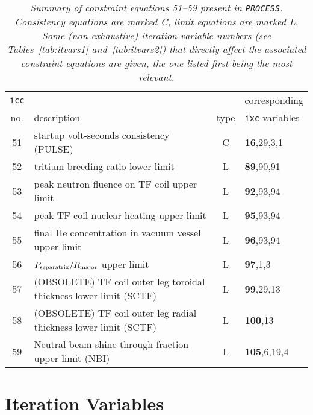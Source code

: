 \documentclass[11pt,a4paper]{report}
\newcommand{\process}{\mbox{\texttt{PROCESS}}}
\begin{document}
\begin{table}[tbph]
\footnotesize
\begin{center}

\begin{tabular}{||c|l|c|l||} \hline
\texttt{icc} &                                                  &      & corresponding \\
no. & description                                               & type & \texttt{ixc} variables \\ \hline
51  & startup volt-seconds consistency (PULSE)                  & C    & \textbf{16},29,3,1 \\
52  & tritium breeding ratio lower limit                        & L    & \textbf{89},90,91 \\
53  & peak neutron fluence on TF coil upper limit               & L    & \textbf{92},93,94 \\
54  & peak TF coil nuclear heating upper limit                  & L    & \textbf{95},93,94 \\
55  & final He concentration in vacuum vessel upper limit       & L    & \textbf{96},93,94 \\
56  & $P_{\mbox{\scriptsize separatrix}}/R_{\mbox{\scriptsize major}}$ upper limit & L    & \textbf{97},1,3 \\
57  & (OBSOLETE) TF coil outer leg toroidal thickness lower limit (SCTF)   & L    & \textbf{99},29,13  \\
58  & (OBSOLETE) TF coil outer leg radial thickness lower limit (SCTF)     & L    & \textbf{100},13 \\
59  & Neutral beam shine-through fraction upper limit (NBI)     & L    & \textbf{105},6,19,4 \\
\hline
\end{tabular}
\end{center}
\caption[List of constraint equations 51 onwards]
{\label{tab:eqns2}
  \textit{Summary of constraint equations 51--59 present in \process. Consistency
    equations are marked C, limit equations are marked L\@. Some
    (non-exhaustive) iteration variable numbers (see Tables~\ref{tab:itvars1}
    and~\ref{tab:itvars2}) that directly affect the associated constraint
    equations are given, the one listed first being the most relevant.}
}
\normalsize
\end{table}

\section{Iteration Variables}
\label{sec:itvars}
\end{document}
